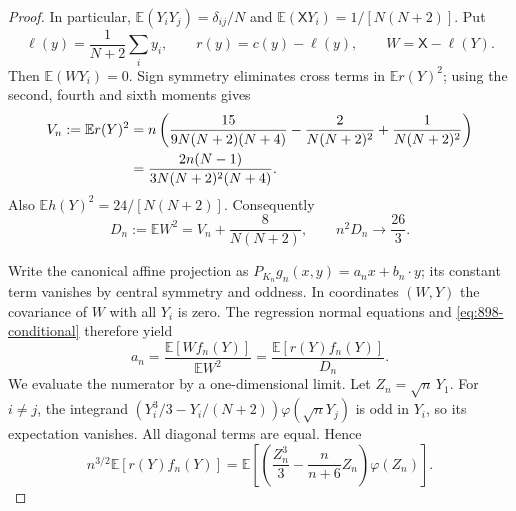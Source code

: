\documentclass[11pt,a4paper]{article}
\theoremstyle{remark}
\begin{document}
\begin{proof}
In particular,
$\mathbb E(Y_iY_j)=\delta_{ij}/N$ and
$\mathbb E(\mathsf X Y_i)=1/[N(N+2)]$.
Put
\[
 \ell(y)=\frac1{N+2}\sum_i y_i,\qquad
 r(y)=c(y)-\ell(y),\qquad W=\mathsf X-\ell(Y).
\]
Then $\mathbb E(WY_i)=0$.  Sign symmetry eliminates cross terms in
$\mathbb Er(Y)^2$; using the second, fourth and sixth moments gives
\begin{align}
 V_n:=\mathbb Er(Y)^2
 &=n\left(
 \frac{15}{9N(N+2)(N+4)}
 -\frac{2}{N(N+2)^2}
 +\frac1{N(N+2)^2}\right)\notag\\
 &=\frac{2n(N-1)}{3N(N+2)^2(N+4)}.
 \label{eq:898-residual}
\end{align}
Also $\mathbb Eh(Y)^2=24/[N(N+2)]$.  Consequently
\begin{equation}\label{eq:898-denominator}
 D_n:=\mathbb EW^2=V_n+\frac8{N(N+2)},
 \qquad n^2D_n\longrightarrow\frac{26}{3}.
\end{equation}

Write the canonical affine projection as
$P_{K_n}g_n(x,y)=a_nx+b_n\cdot y$; its constant term vanishes by
central symmetry and oddness.  In coordinates $(W,Y)$ the covariance
of $W$ with all $Y_i$ is zero.  The regression normal equations and
\eqref{eq:898-conditional} therefore yield
\begin{equation}\label{eq:898-coefficient}
 a_n=\frac{\mathbb E[Wf_n(Y)]}{\mathbb EW^2}
     =\frac{\mathbb E[r(Y)f_n(Y)]}{D_n}.
\end{equation}
We evaluate the numerator by a one-dimensional limit.
Let $Z_n=\sqrt n\,Y_1$.  For $i\ne j$, the integrand
$(Y_i^3/3-Y_i/(N+2))\varphi(\sqrt nY_j)$ is odd in $Y_i$,
so its expectation vanishes.  All diagonal terms are equal.  Hence
\begin{equation}\label{eq:898-numerator}
 n^{3/2}\mathbb E[r(Y)f_n(Y)]
 =\mathbb E\left[
 \left(\frac{Z_n^3}{3}-\frac{n}{n+6}Z_n\right)\varphi(Z_n)\right].
\end{equation}


\end{proof}
\end{document}
